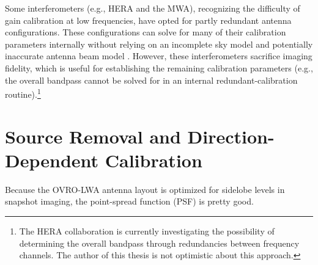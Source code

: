 \begin{bibunit}
Some interferometers (e.g., HERA and the MWA), recognizing the difficulty of gain calibration at low
frequencies, have opted for partly redundant antenna configurations. These configurations can solve
for many of their calibration parameters internally without relying on an incomplete sky model and
potentially inaccurate antenna beam model \citep{2010MNRAS.408.1029L}. However, these
interferometers sacrifice imaging fidelity, which is useful for establishing the remaining
calibration parameters (e.g., the overall bandpass cannot be solved for in an internal
redundant-calibration routine).\footnote{
    The HERA collaboration is currently investigating the possibility of determining the overall
    bandpass through redundancies between frequency channels. The author of this thesis is not
    optimistic about this approach.
}

\section{Source Removal and Direction-Dependent Calibration}


Because the OVRO-LWA antenna layout is optimized for sidelobe levels in snapshot imaging, the
point-spread function (PSF) is pretty good.

\end{bibunit}


